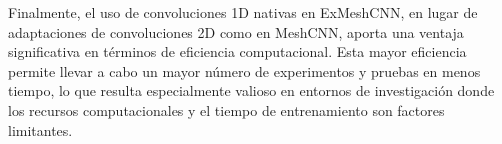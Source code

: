 Finalmente, el uso de convoluciones 1D nativas en ExMeshCNN, en lugar de adaptaciones de convoluciones 2D como en MeshCNN, aporta una ventaja significativa en términos de eficiencia computacional. Esta mayor eficiencia permite llevar a cabo un mayor número de experimentos y pruebas en menos tiempo, lo que resulta especialmente valioso en entornos de investigación donde los recursos computacionales y el tiempo de entrenamiento son factores limitantes.
